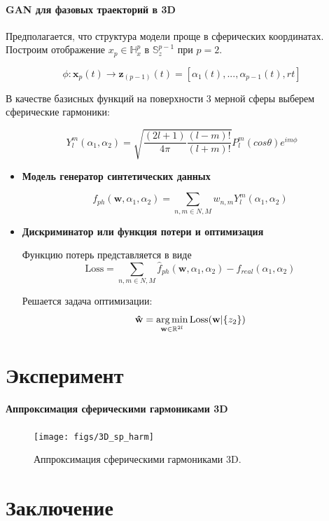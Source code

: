 \documentclass[12pt,twoside]{article}
\begin{document}
\paragraph{GAN для фазовых траекторий в 3D}

Предполагается, что структура модели проще в сферических координатах.
Построим отображение $x_p \in \mathbb{H}_{x}^{p} $ в $\mathbb{S}_{z}^{p-1} $ при $p = 2$.

\begin{equation}
	\phi: \mathbf{x}_p(t)  \xrightarrow{} \mathbf{z}_{(p-1)}(t) = [\alpha_{1} (t),..., \alpha_{p-1}(t), r{t}]
\label{eq:param_model2}
\end{equation}

В качестве базисных функций на поверхности 3 мерной сферы выберем сферические гармоники:

\begin{equation}
	Y_l^m(\alpha_1,\alpha_2) = \sqrt{ \frac{(2l+1)}{4\pi} \frac{(l-m)!}{(l+m)!} } P_l^m(cos\theta)e^{im\phi}
\label{eq:Yml}
\end{equation}

\begin{itemize}
\item \textbf{Модель генератор синтетических данных}

\begin{equation}
	f_{ph}(\mathbf{w},\alpha_1,\alpha_2) = \sum_{n,m \in N,M} w_{n,m}Y_l^m(\alpha_1,\alpha_2)
\label{eq:f_ph_3d}
\end{equation}
\vspace{\baselineskip}

\item \textbf{Дискриминатор или функция потери и оптимизация}

Функцию потерь представляется в виде
\begin{equation}
\textrm{Loss} =  \sum_{n,m \in N,M} \hat{f}_{ph}(\mathbf{w},\alpha_1,\alpha_2) - f_{real}(\alpha_{1},\alpha_2)
\label{eq:L_3d}
\end{equation}

Решается задача оптимизации:
\begin{equation}
\mathbf{\hat{w}} = \argmin_{\mathbf{w} \in \mathbb{R}^{2l}} \textrm{Loss}(\mathbf{w}|\{z_{2}\})
\label{eq:arg_l}
\end{equation}
\end{itemize}


\section{Эксперимент}

\paragraph{Аппроксимация сферическими гармониками 3D}

\begin{figure}[h]
\centering
\texttt{[image: figs/3D\_sp\_harm]}
\caption{Аппроксимация сферическими гармониками 3D. }
\label{fg:3D_sp_harm}
\end{figure}

\section{Заключение}
\newpage


\end{document}
